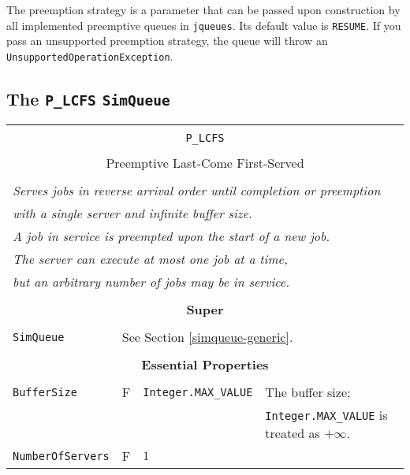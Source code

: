 \documentclass[12pt]{book}
\begin{document}
The preemption strategy is a parameter that can be passed upon construction by all implemented
  preemptive queues in \lstinline|jqueues|.
Its default value is \lstinline|RESUME|.
If you pass an unsupported preemption strategy,
  the queue will throw an \lstinline|UnsupportedOperationException|.

\subsection{The \lstinline{P_LCFS} \lstinline{SimQueue}}

\begin{tabular}{|l|l|l|l|}
\hline
\multicolumn{4}{|c|}{} \\
\multicolumn{4}{|c|}{\lstinline[basicstyle=\large]{P_LCFS}} \\
\multicolumn{4}{|c|}{} \\
\multicolumn{4}{|c|}{Preemptive Last-Come First-Served} \\
\multicolumn{4}{|c|}{} \\
\hline
\multicolumn{4}{|l|}{\em Serves jobs in reverse arrival order until completion or preemption} \\
\multicolumn{4}{|l|}{\em with a single server and infinite buffer size.} \\
\multicolumn{4}{|l|}{\em A job in service is preempted upon the start of a new job.} \\
\multicolumn{4}{|l|}{\em The server can execute at most one job at a time,} \\
\multicolumn{4}{|l|}{\em but an arbitrary number of jobs may be in service.} \\
\hline
\multicolumn{4}{|c|}{} \\
\multicolumn{4}{|c|}{\bf Super} \\
\multicolumn{4}{|c|}{} \\
\hline
\lstinline|SimQueue| & \multicolumn{3}{|l|}{See Section \ref{simqueue-generic}.} \\
\hline
\multicolumn{4}{|c|}{} \\
\multicolumn{4}{|c|}{\bf Essential Properties} \\
\multicolumn{4}{|c|}{} \\
\hline
\lstinline|BufferSize|      & F & \lstinline|Integer.MAX_VALUE|
                            & The buffer size; \\
                        & & & \lstinline|Integer.MAX_VALUE| is treated as $+\infty$. \\
\hline
\lstinline|NumberOfServers|    & F & $1$

\end{tabular}
\end{document}
